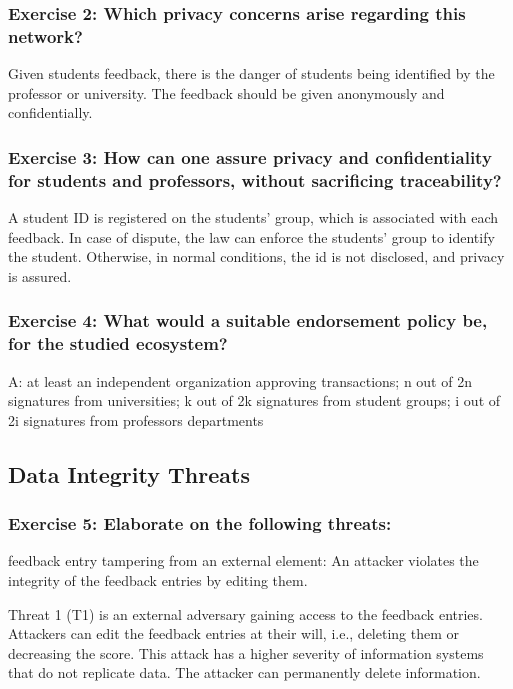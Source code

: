 \documentclass[12pt,a4paper]{article}
\begin{document}
\subsubsection*{Exercise 2: Which privacy concerns arise regarding this network?}

Given students feedback, there is the danger of students being identified by the professor or university. The feedback should be given anonymously and confidentially.

\subsubsection*{Exercise 3: How can one assure privacy and confidentiality for students and professors, without sacrificing traceability?}

A student ID is registered on the students' group, which is associated with each feedback. In case of dispute, the law can enforce the students' group to identify the student. Otherwise, in normal conditions, the id is not disclosed, and privacy is assured.

\subsubsection*{Exercise 4: What would a suitable endorsement policy be, for the studied ecosystem?}
A: at least an independent organization approving transactions; n out of 2n signatures from universities; k out of 2k signatures from student groups; i out of 2i signatures from professors departments

\subsection{Data Integrity Threats}

\subsubsection*{Exercise 5: Elaborate on the following threats:}

\begin{threat}{feedback entry tampering from an external element:} An attacker violates the integrity of the feedback entries by editing them.
\end{threat}


Threat 1 (T1) is an external adversary gaining access to the feedback entries. Attackers can edit the feedback entries at their will, i.e., deleting them or decreasing the score. This attack has a higher severity of information systems that do not replicate data. The attacker can permanently delete information.
\end{document}
